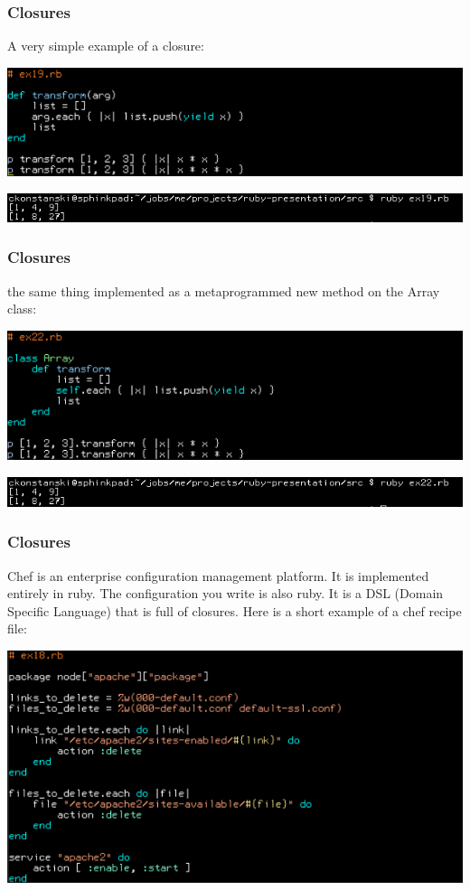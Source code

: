 \documentclass[helvetica,english,utf8,notitle,nologo]{beamer}
\begin{document}
\begin{frame}
  \frametitle{Closures}

  A very simple example of a closure:

  \includegraphics[scale=0.53]{src_19}

  \includegraphics[scale=0.5]{out_19}
\end{frame}

\begin{frame}
  \frametitle{Closures}

  the same thing implemented as a metaprogrammed new method on the
  Array class:

  \includegraphics[scale=0.53]{src_22}

  \includegraphics[scale=0.5]{out_22}
\end{frame}

\begin{frame}
  \frametitle{Closures}

  Chef is an enterprise configuration management platform. It is
  implemented entirely in ruby. The configuration you write is also
  ruby. It is a DSL (Domain Specific Language) that is full of
  closures. Here is a short example of a chef recipe file:

  \includegraphics[scale=0.53]{src_18}
\end{frame}
\end{document}
